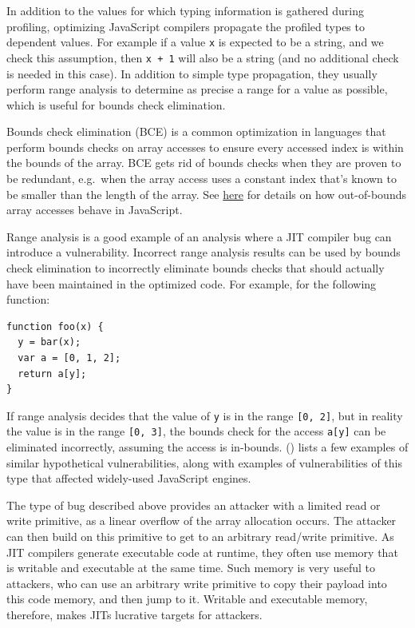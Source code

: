 \documentclass[
  a4paper,
]{report}
\begin{document}
In addition to the values for which typing information is gathered
during profiling, optimizing JavaScript compilers propagate the profiled
types to dependent values. For example if a value \texttt{x} is expected
to be a string, and we check this assumption, then \texttt{x\ +\ 1} will
also be a string (and no additional check is needed in this case). In
addition to simple type propagation, they usually perform
\label{__index_entry_95}{range
analysis} to determine as precise a range for a
value as possible, which is useful for
\label{__index_entry_96}{bounds check
elimination}.

\label{__index_entry_97}{Bounds check elimination
(BCE)} is a common optimization in
languages that perform bounds checks on array accesses to ensure every
accessed index is within the bounds of the array. BCE gets rid of bounds
checks when they are proven to be redundant, e.g.~when the array access
uses a constant index that's known to be smaller than the length of the
array. See
\href{https://developer.mozilla.org/en-US/docs/Web/JavaScript/Reference/Global_Objects/Array/length}{here}
for details on how out-of-bounds array accesses behave in JavaScript.

Range analysis is a good example of an analysis where a JIT compiler bug
can introduce a vulnerability. Incorrect range analysis results can be
used by bounds check elimination to incorrectly eliminate bounds checks
that should actually have been maintained in the optimized code. For
example, for the following function:

\begin{verbatim}
function foo(x) {
  y = bar(x);
  var a = [0, 1, 2];
  return a[y];
}
\end{verbatim}

If range analysis decides that the value of \texttt{y} is in the range
\texttt{{[}0,\ 2{]}}, but in reality the value is in the range
\texttt{{[}0,\ 3{]}}, the bounds check for the access \texttt{a{[}y{]}}
can be eliminated incorrectly, assuming the access is in-bounds.
() lists a few examples of
similar hypothetical vulnerabilities, along with examples of
vulnerabilities of this type that affected widely-used JavaScript
engines.

The type of bug described above provides an attacker with a limited read
or write primitive, as a linear overflow of the array allocation occurs.
The attacker can then build on this primitive to get to an arbitrary
read/write primitive. As JIT compilers generate executable code at
runtime, they often use memory that is writable and executable at the
same time. Such memory is very useful to attackers, who can use an
arbitrary write primitive to copy their payload into this code memory,
and then jump to it. Writable and executable memory, therefore, makes
JITs lucrative targets for attackers.
\end{document}
